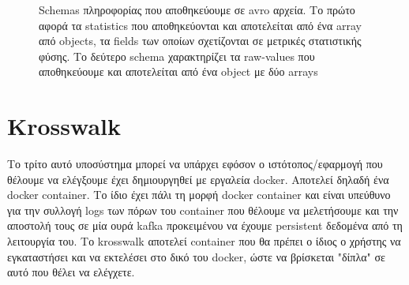 \begin{figure}[!ht]
	\centering
	\caption[Schemas πληροφορίας που αποθηκεύουμε σε avro αρχεία]{Schemas πληροφορίας που αποθηκεύουμε σε avro αρχεία. Το πρώτο αφορά τα statistics που αποθηκεύονται και αποτελείται από ένα array από objects, τα fields των οποίων σχετίζονται σε μετρικές στατιστικής φύσης. Το δεύτερο schema χαρακτηρίζει τα raw-values που αποθηκεύουμε και αποτελείται από ένα object με δύο arrays}
	\label{fig:avro_types}
\end{figure}

\section{Krosswalk}
\label{section:lychte_krosswakl}

Το τρίτο αυτό υποσύστημα μπορεί να υπάρχει εφόσον ο ιστότοπος/εφαρμογή που θέλουμε να ελέγξουμε έχει δημιουργηθεί με εργαλεία docker. Αποτελεί δηλαδή ένα docker container. Το ίδιο έχει πάλι τη μορφή docker container και είναι υπεύθυνο για την συλλογή logs των πόρων του container που θέλουμε να μελετήσουμε και την αποστολή τους σε μία ουρά kafka προκειμένου να έχουμε persistent δεδομένα από τη λειτουργία του. Το krosswalk αποτελεί container που θα πρέπει ο ίδιος ο χρήστης να εγκαταστήσει και να εκτελέσει στο δικό του docker, ώστε να βρίσκεται "δίπλα" σε αυτό που θέλει να ελέγχετε.

